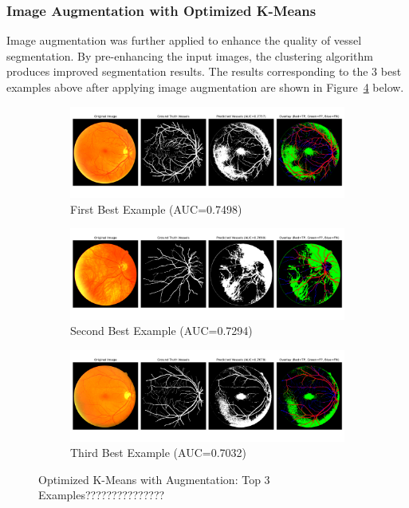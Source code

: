 \documentclass[12pt,letterpaper]{article}
\begin{document}
\subsubsection{Image Augmentation with Optimized K-Means}
Image augmentation was further applied to enhance the quality of vessel segmentation. By pre-enhancing the input images, the clustering algorithm produces improved segmentation results. The results corresponding to the 3 best examples above after applying image augmentation are shown in Figure~\ref{fig:opt_aug} below. 
\begin{figure}[H]
    \centering
    \begin{subfigure}[H]{\textwidth}
        \centering
        \includegraphics[scale=0.35]{Figures/4 Optimized 1st.png}
        \vspace{-0.5cm}
        \caption{First Best Example (AUC=0.7498)}
        \label{fig:opt_aug1}
    \end{subfigure}
    \begin{subfigure}[H]{\textwidth}
        \centering
        \includegraphics[scale=0.35]{Figures/4 Optimized 2nd.png}
        \vspace{-0.5cm}
        \caption{Second Best Example (AUC=0.7294)}
        \label{fig:opt_aug2}
    \end{subfigure}
    \begin{subfigure}[H]{\textwidth}
        \centering
        \includegraphics[scale=0.35]{Figures/4 Optimized 3rd.png}
        \vspace{-0.5cm}
        \caption{Third Best Example (AUC=0.7032)}
        \label{fig:opt_aug3}
    \end{subfigure}
    \caption{Optimized K-Means with Augmentation: Top 3 Examples???????????????}
    \label{fig:opt_aug}
\end{figure}
\end{document}
